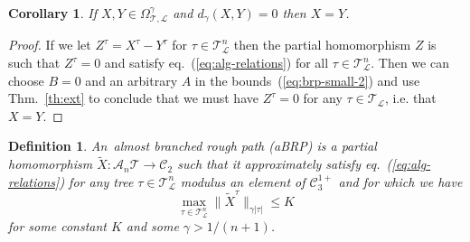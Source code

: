 \documentclass[a4paper,11pt,reqno]{article}
\newcommand{\1}{{\bf 1}}
\newcommand{\CC}{\mathcal{C}}
\newcommand{\LL}{\mathcal{L}}
\newcommand{\cl}{\mathcal L}
\newtheorem{corollary}[theorem]{Corollary}
\newtheorem{definition}[theorem]{Definition}
\newcommand{\TT}{\mathcal{T}}
\newcommand{\cA}{\mathcal{A}}
\begin{document}
\begin{corollary}
If $X,Y \in \Omega^\gamma_{\TT,\LL}$ and $d_\gamma(X,Y) = 0$ then $X=Y$.  
\end{corollary}
\begin{proof}
If we let
$
Z^\tau = X^\tau-Y^\tau
$ for $\tau \in \TT^n_\LL$ then the partial homomorphism $Z$ is such that $Z^\tau = 0$ and satisfy
eq.~(\ref{eq:alg-relations}) for all $\tau \in \TT^n_\LL$. Then we
can choose $B=0$ and an arbitrary $A$ in  the
bounds~(\ref{eq:brp-small-2}) and use Thm.~\ref{th:ext} to conclude that we must have $Z^\tau =
0$ for any $\tau \in \TT_\LL$, i.e. that $X=Y$.  
\end{proof}



\begin{definition}
An~\emph{almost branched rough path} (aBRP) is a partial homomorphism $\widetilde X:
\cA_n \TT  \to \CC_2$ such that it approximately satisfy
eq.~(\ref{eq:alg-relations}) for any tree $\tau \in \TT_\cl^n$ modulus an element of $\CC^{1+}_3$
and for which we have
\begin{equation}
  \label{eq:abrp-small}
 \max_{\tau \in\TT_\cl^n} \|\widetilde X^\tau\|_{\gamma |\tau|} \le K 
\end{equation}
for some constant $K$ and some $\gamma > 1/(n+1)$.
 \end{definition}
\end{document}
